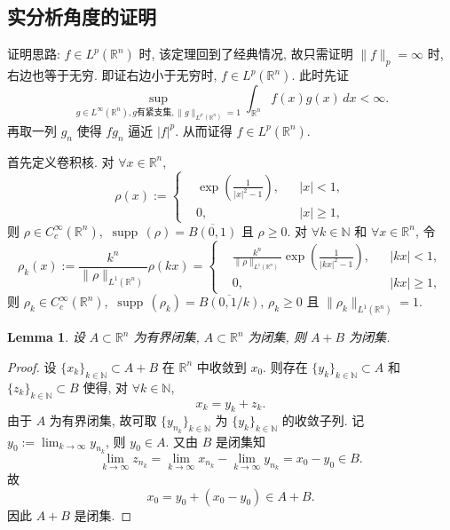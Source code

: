 \documentclass[a4paper,11pt]{article}
\newtheorem{lemma}[theorem]{Lemma}
\theoremstyle{definition}
\def \supp {\mathop\mathrm{\,supp\,}}
\begin{document}
\begin{CJK*}{UTF8}{gbsn}
\subsection{实分析角度的证明}

证明思路: $ f \in L^p(\mathbb{R}^n) $ 时, 该定理回到了经典情况, 
故只需证明 $ \| f \|_p = \infty $ 时, 右边也等于无穷. 
即证右边小于无穷时, $ f \in L^p(\mathbb{R}^n) $.
此时先证
$$
    \sup_{g \in L^\infty(\mathbb{R}^n), g \text{有紧支集}, \| g \|_{L^{p'}(\mathbb{R}^n)} = 1} 
        \int_{\mathbb{R}^n} f(x) g(x) \, dx < \infty.
$$
再取一列 $ g_n $ 使得 $ fg_n $ 逼近 $ |f|^p $. 从而证得 $ f \in L^p(\mathbb{R}^n) $.

首先定义卷积核. 对 $ \forall x \in \mathbb{R}^n $,
$$
    \rho(x) := \left\{ \begin{aligned}
        &\exp\left( \frac{1}{|x|^2 - 1} \right), && |x| < 1, \\
        &0,                             && |x| \geq 1,
    \end{aligned}\right.
$$
则 $ \rho \in C_c^\infty(\mathbb{R}^n) $, $ \supp(\rho) = \overline{B(0, 1)} $ 且 $ \rho \geq 0 $. 
对 $ \forall k \in \mathbb{N} $ 和 $ \forall x \in \mathbb{R}^n $, 令
$$
    \rho_k(x) := \frac{k^n}{\| \rho \|_{L^1(\mathbb{R}^n)}} \rho(kx)
        = \left\{ \begin{aligned}
        &\frac{k^n}{\| \rho \|_{L^1(\mathbb{R}^n)}} \exp\left( \frac{1}{|kx|^2 - 1} \right), && |kx| < 1, \\
        &0,                             && |kx| \geq 1,
    \end{aligned}\right.
$$
则 $ \rho_k \in C_c^\infty(\mathbb{R}^n) $, $ \supp(\rho_k) = \overline{B(0, 1/k)} $, $ \rho_k \geq 0 $
且 $ \| \rho_k \|_{L^1(\mathbb{R}^n)} = 1 $. 


\begin{lemma} \label{924}
    设 $ A \subset \mathbb{R}^n $ 为有界闭集, $ A \subset \mathbb{R}^n $ 为闭集, 则 $ A+B $ 为闭集.
\end{lemma}

\begin{proof}
    设 $ \{x_k\}_{k \in \mathbb{N}} \subset A+B $ 在 $ \mathbb{R}^n $ 中收敛到 $ x_0 $.
    则存在 $ \{y_k\}_{k \in \mathbb{N}} \subset A $ 和 $ \{z_k\}_{k \in \mathbb{N}} \subset B $
    使得, 对 $ \forall k \in \mathbb{N} $,
    $$
        x_k = y_k + z_k.
    $$
    由于 $ A $ 为有界闭集, 故可取 $ \{y_{n_k}\}_{k \in \mathbb{N}} $ 为 $ \{y_k\}_{k \in \mathbb{N}} $ 的收敛子列.
    记 $ y_0 := \lim_{k \to \infty} y_{n_k} $, 则 $ y_0 \in A $. 又由 $ B $ 是闭集知
    $$
        \lim_{k \to \infty} z_{n_k} 
            = \lim_{k \to \infty} x_{n_k} - \lim_{k \to \infty} y_{n_k} 
            = x_0 - y_0
            \in B.
    $$
    故
    $$
        x_0 = y_0 + (x_0 - y_0) \in A + B.
    $$
    因此 $ A + B $ 是闭集.
\end{proof}


\end{CJK*}
\end{document}
